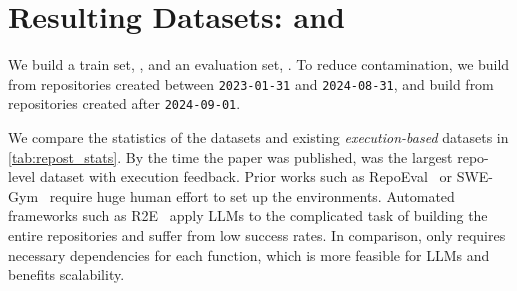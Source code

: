 \begin{table}[t]
\centering
{}
\caption{Agreement between human and GPT-4o on checking (1) the functionality equivalence between the sandboxed and original function, and (2) the test correctness.
When GPT-4o predicts ``Yes'' for both quality checks, it has a high agreement with human.}
\label{tab:repost_agreement}

\end{table}

\begin{table}[t]
\centering
{}
\caption{Human study results. We ask the participants to complete the function with the same context we use to evaluate code generation models in \S\ref{sec:code_gen_exps}.}
\label{tab:repost_human_study_1}
\end{table}




\section{Resulting Datasets: \reposttrainsetName and \repostevalsetName}
\label{sec:dataset_stats}

We build a train set, \reposttrainsetName, and an evaluation set, \repostevalsetName.
To reduce contamination, we build \reposttrainsetName from repositories created between \texttt{2023-01-31} and \texttt{2024-08-31},
and build \repostevalsetName from repositories created after \texttt{2024-09-01}.


We compare the statistics of the datasets and existing \textit{execution-based} datasets in \autoref{tab:repost_stats}.
By the time the paper was published, \reposttrainsetName was the largest repo-level dataset with execution feedback.
Prior works such as RepoEval~\citep{repocoder} or SWE-Gym~\citep{swegym} require huge human effort to set up the environments.
Automated frameworks such as R2E~\citep{R2E} apply LLMs to the complicated task of building the entire repositories and suffer from low success rates.
In comparison, \repostmethodName only requires necessary dependencies for each function, which is more feasible for LLMs and benefits scalability.




